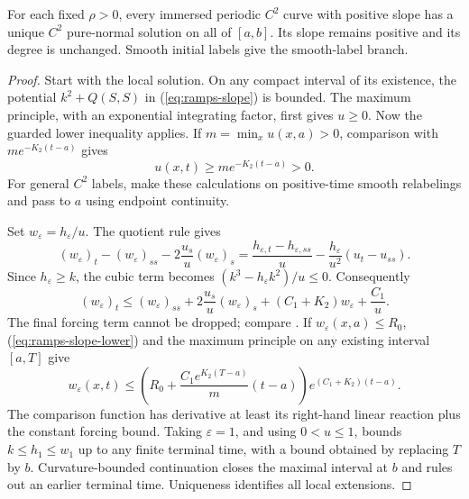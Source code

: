 \begin{proposition}
\label{prop:ramps-global}
For each fixed $\rho>0$, every immersed periodic $C^2$ curve with positive
slope has a unique $C^2$ pure-normal solution on all of $[a,b]$.
Its slope remains positive and its degree is unchanged.  Smooth initial
labels give the smooth-label branch.
\end{proposition}
\begin{proof}
Start with the local solution.  On any compact interval of its existence,
the potential $k^2+Q(S,S)$ in (\ref{eq:ramps-slope}) is bounded.
The maximum principle, with an exponential integrating factor, first gives
$u\geq0$.  Now the guarded lower inequality applies.  If
$m=\min_x u(x,a)>0$, comparison with $m e^{-K_2(t-a)}$ gives
\begin{equation}\label{eq:ramps-slope-lower}
 u(x,t)\geq m e^{-K_2(t-a)}>0.
\end{equation}
For general $C^2$ labels, make these calculations on positive-time smooth
relabelings and pass to $a$ using endpoint continuity.

Set $w_\varepsilon=h_\varepsilon/u$.  The quotient rule gives
\[
 (w_\varepsilon)_t-(w_\varepsilon)_{ss}
       -2\frac{u_s}{u}(w_\varepsilon)_s
 =\frac{h_{\varepsilon,t}-h_{\varepsilon,ss}}u
       -\frac{h_\varepsilon}{u^2}(u_t-u_{ss}).
\]
Since $h_\varepsilon\geq k$, the cubic term becomes
$(k^3-h_\varepsilon k^2)/u\leq0$.  Consequently
\begin{equation}\label{eq:ramps-forced-quotient}
 (w_\varepsilon)_t\leq(w_\varepsilon)_{ss}
   +2\frac{u_s}{u}(w_\varepsilon)_s
   +(C_1+K_2)w_\varepsilon+\frac{C_1}{u}.
\end{equation}
The final forcing term cannot be dropped; compare
\cite[pp.~8--9, corrected ramp comparison]{MT2015Correction}.
If $w_\varepsilon(x,a)\leq R_0$, (\ref{eq:ramps-slope-lower}) and the
maximum principle on any existing interval $[a,T]$ give
\[
 w_\varepsilon(x,t)\leq
 \left(R_0+\frac{C_1e^{K_2(T-a)}}m(t-a)\right)
                e^{(C_1+K_2)(t-a)}.
\]
The comparison function has derivative at least its right-hand linear
reaction plus the constant forcing bound.  Taking $\varepsilon=1$, and
using $0<u\leq1$, bounds $k\leq h_1\leq w_1$ up to any finite terminal
time, with a bound obtained by replacing $T$ by $b$.  Curvature-bounded
continuation closes the maximal interval at $b$ and rules out an earlier
terminal time.  Uniqueness identifies all local extensions.
\end{proof}

